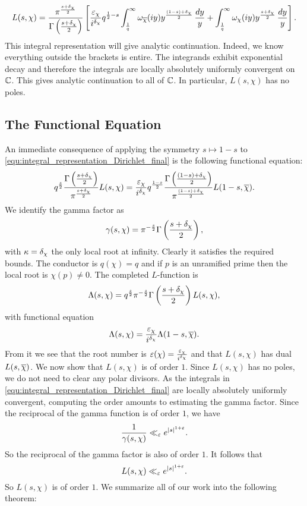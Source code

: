       \begin{equation}\label{equ:integral_representation_Dirichlet_final}
        L(s,\chi) = \frac{\pi^{\frac{s+\delta_{\chi}}{2}}}{\Gamma\left(\frac{s+\delta_{\chi}}{2}\right)}\left[\frac{\varepsilon_{\chi}}{i^{\delta_{\chi}}}q^{\frac{1}{2}-s}\int_{\frac{1}{q}}^{\infty}\omega_{\overline{\chi}}(iy)y^{\frac{(1-s)+\delta_{\chi}}{2}}\,\frac{dy}{y}+\int_{\frac{1}{q}}^{\infty}\omega_{\chi}(iy)y^{\frac{s+\delta_{\chi}}{2}}\,\frac{dy}{y}\right].
      \end{equation}
      This integral representation will give analytic continuation. Indeed, we know everything outside the brackets is entire. The integrands exhibit exponential decay and therefore the integrals are locally absolutely uniformly convergent on $\mathbb{C}$. This gives analytic continuation to all of $\mathbb{C}$. In particular, $L(s,\chi)$ has no poles.
    \subsection*{The Functional Equation}
      An immediate consequence of applying the symmetry $s \mapsto 1-s$ to \cref{equ:integral_representation_Dirichlet_final} is the following functional equation:
      \[
        q^{\frac{s}{2}}\frac{\Gamma\left(\frac{s+\delta_{\chi}}{2}\right)}{\pi^{\frac{s+\delta_{\chi}}{2}}}L(s,\chi) = \frac{\varepsilon_{\chi}}{i^{\delta_{\chi}}}q^{\frac{1-s}{2}}\frac{\Gamma\left(\frac{(1-s)+\delta_{\chi}}{2}\right)}{\pi^{\frac{(1-s)+\delta_{\chi}}{2}}}L(1-s,\overline{\chi}).
      \]
      We identify the gamma factor as
      \[
        \gamma(s,\chi) = \pi^{-\frac{s}{2}}\Gamma\left(\frac{s+\delta_{\chi}}{2}\right),
      \]
      with $\kappa = \delta_{\chi}$ the only local root at infinity. Clearly it satisfies the required bounds. The conductor is $q(\chi) = q$ and if $p$ is an unramified prime then the local root is $\chi(p) \neq 0$. The completed $L$-function is
      \[
        \Lambda(s,\chi) = q^{\frac{s}{2}}\pi^{-\frac{s}{2}}\Gamma\left(\frac{s+\delta_{\chi}}{2}\right)L(s,\chi),
      \]
      with functional equation
      \[
        \Lambda(s,\chi) = \frac{\varepsilon_{\chi}}{i^{\delta_{\chi}}}\Lambda(1-s,\overline{\chi}).
      \]
      From it we see that the root number is $\varepsilon(\chi) = \frac{\varepsilon_{\chi}}{i^{\delta_{\chi}}}$ and that $L(s,\chi)$ has dual $L(s,\overline{\chi})$. We now show that $L(s,\chi)$ is of order $1$. Since $L(s,\chi)$ has no poles, we do not need to clear any polar divisors. As the integrals in \cref{equ:integral_representation_Dirichlet_final} are locally absolutely uniformly convergent, computing the order amounts to estimating the gamma factor. Since the reciprocal of the gamma function is of order $1$, we have
      \[
        \frac{1}{\gamma(s,\chi)} \ll_{\varepsilon} e^{|s|^{1+\varepsilon}}.
      \]
      So the reciprocal of the gamma factor is also of order $1$. It follows that
      \[
        L(s,\chi) \ll_{\varepsilon} e^{|s|^{1+\varepsilon}}.
      \]
      So $L(s,\chi)$ is of order $1$. We summarize all of our work into the following theorem:

